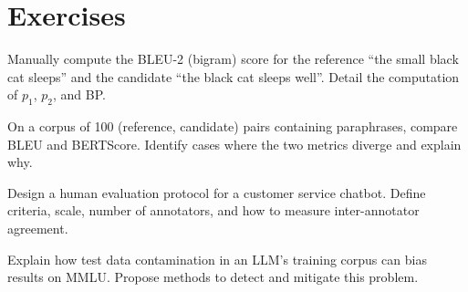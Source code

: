 \section{Exercises}
\label{sec:eval:exercises}

\begin{exercise}
Manually compute the BLEU-2 (bigram) score for the reference ``the small
black cat sleeps'' and the candidate ``the black cat sleeps well''.
Detail the computation of $p_1$, $p_2$, and BP.
\end{exercise}

\begin{exercise}
On a corpus of 100 (reference, candidate) pairs containing paraphrases,
compare BLEU and BERTScore. Identify cases where the two metrics diverge
and explain why.
\end{exercise}

\begin{exercise}
Design a human evaluation protocol for a customer service chatbot.
Define criteria, scale, number of annotators, and how to measure
inter-annotator agreement.
\end{exercise}

\begin{exercise}
Explain how test data contamination in an LLM's training corpus can
bias results on MMLU. Propose methods to detect and mitigate this
problem.
\end{exercise}
